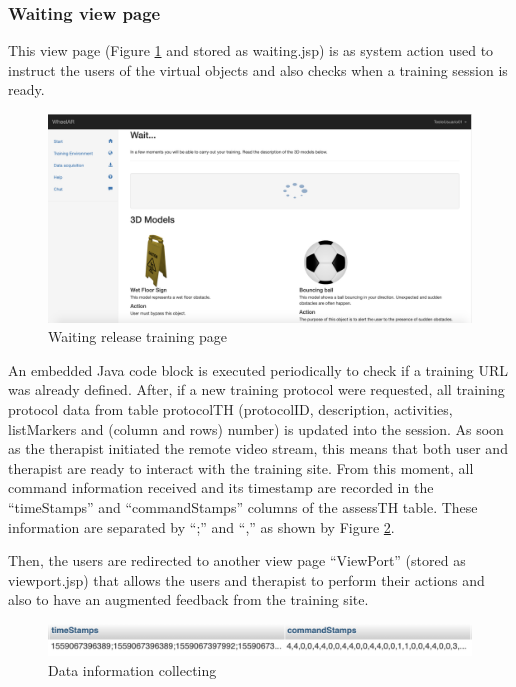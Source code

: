 \subsubsection{Waiting view page}
\label{sec:waitingVP}

This view page (Figure \ref{fig:tWaitingSession} and stored as waiting.jsp) is as system action used to instruct the users of the virtual objects and also checks when a training session is ready. 

\begin{figure}[!hbt]
\begin{center}
\includegraphics[width=0.95\linewidth]{img/cap5/tWaitingSession}
\caption{Waiting release training page} \label{fig:tWaitingSession}
\end{center}
\vspace{-15pt}
\end{figure}

An embedded Java code block is executed periodically to check if a training URL was already defined. After, if a new training protocol were requested, all training protocol data from table protocolTH (protocolID, description, activities, listMarkers and (column and rows) number) is updated into the session. As soon as the therapist initiated the remote video stream, this means that both user and therapist are ready to interact with the training site. From this moment, all command information received and its timestamp are recorded in the ``timeStamps'' and ``commandStamps'' columns of the assessTH table. These information are separated by ``;'' and ``,'' as shown by Figure \ref{fig:cmdAndTime-Stamps}.

Then, the users are redirected to another view page ``ViewPort'' (stored as viewport.jsp) that allows the users and therapist to perform their actions and also to have an augmented feedback from the training site.

\begin{figure}[!hbt]
\begin{center}
\includegraphics[width=1\linewidth]{img/cap5/cmdAndTime-Stamps}
\caption{Data information collecting} \label{fig:cmdAndTime-Stamps}
\end{center}
\vspace{-15pt}
\end{figure}

